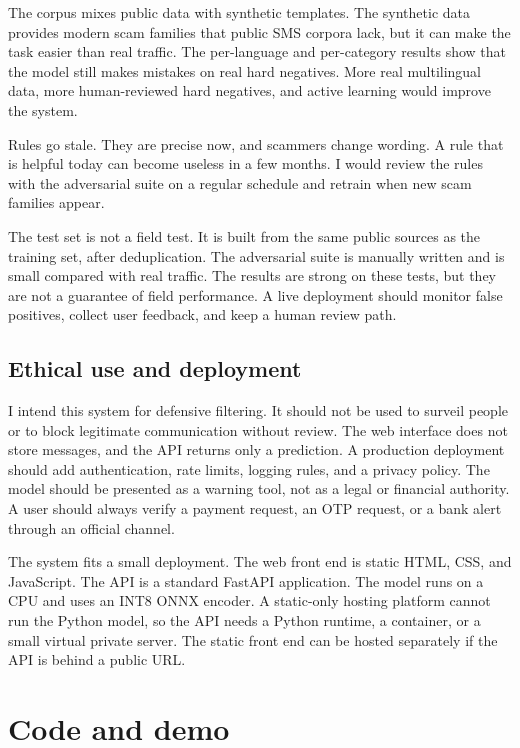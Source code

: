 \documentclass[11pt]{article}
\begin{document}
The corpus mixes public data with synthetic templates. The synthetic data provides modern scam families that public SMS corpora lack, but it can make the task easier than real traffic. The per-language and per-category results show that the model still makes mistakes on real hard negatives. More real multilingual data, more human-reviewed hard negatives, and active learning would improve the system.

Rules go stale. They are precise now, and scammers change wording. A rule that is helpful today can become useless in a few months. I would review the rules with the adversarial suite on a regular schedule and retrain when new scam families appear.

The test set is not a field test. It is built from the same public sources as the training set, after deduplication. The adversarial suite is manually written and is small compared with real traffic. The results are strong on these tests, but they are not a guarantee of field performance. A live deployment should monitor false positives, collect user feedback, and keep a human review path.

\subsection{Ethical use and deployment}

I intend this system for defensive filtering. It should not be used to surveil people or to block legitimate communication without review. The web interface does not store messages, and the API returns only a prediction. A production deployment should add authentication, rate limits, logging rules, and a privacy policy. The model should be presented as a warning tool, not as a legal or financial authority. A user should always verify a payment request, an OTP request, or a bank alert through an official channel.

The system fits a small deployment. The web front end is static HTML, CSS, and JavaScript. The API is a standard FastAPI application. The model runs on a CPU and uses an INT8 ONNX encoder. A static-only hosting platform cannot run the Python model, so the API needs a Python runtime, a container, or a small virtual private server. The static front end can be hosted separately if the API is behind a public URL.

\section*{Code and demo}
\end{document}
